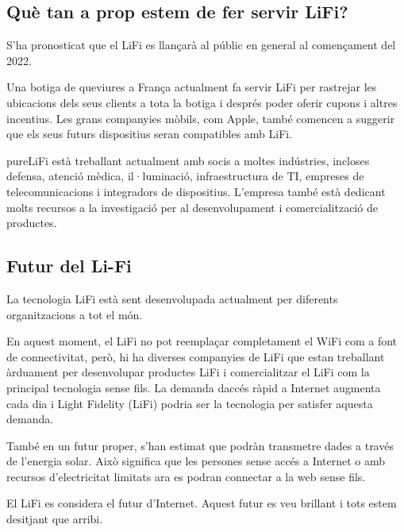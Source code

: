 


\subsection*{Què tan a prop estem de fer servir LiFi?}
S'ha pronosticat que el LiFi es llançarà al públic en general al començament del 2022.

Una botiga de queviures a França actualment fa servir LiFi per rastrejar les ubicacions dels seus clients a tota la botiga i després poder oferir cupons i altres incentius. Les grans companyies mòbils, com Apple, també comencen a suggerir que els seus futurs dispositius seran compatibles amb LiFi.

pureLiFi està treballant actualment amb socis a moltes indústries, incloses defensa, atenció mèdica, il·luminació, infraestructura de TI, empreses de telecomunicacions i integradors de dispositius. L'empresa també està dedicant molts recursos a la investigació per al desenvolupament i comercialització de productes.



\subsection*{Futur del Li-Fi}


La tecnologia LiFi està sent desenvolupada actualment per diferents organitzacions a tot el món.

En aquest moment, el LiFi no pot reemplaçar completament el WiFi com a font de connectivitat, però, hi ha diverses companyies de LiFi que estan treballant àrduament per desenvolupar productes LiFi i comercialitzar el LiFi com la principal tecnologia sense fils. La demanda daccés ràpid a Internet augmenta cada dia i Light Fidelity (LiFi) podria ser la tecnologia per satisfer aquesta demanda.

També en un futur proper, s'han estimat que podràn transmetre dades a través de l'energia solar. Això significa que les persones sense accés a Internet o amb recursos d'electricitat limitats ara es podran connectar a la web sense fils.

El LiFi es considera el futur d'Internet. Aquest futur es veu brillant i tots estem desitjant que arribi.
